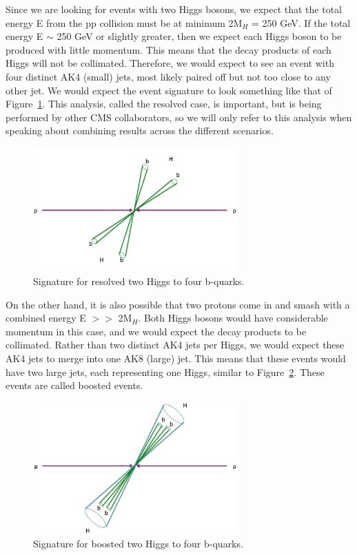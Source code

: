 Since we are looking for events with two Higgs bosons, we expect that the total energy E from the pp collision must be at minimum 2$\text{M}_{H}$ = 250 GeV. If the total energy E $\sim$ 250 GeV or slightly greater, then we expect each Higgs boson to be produced with little momentum. This means that the decay products of each Higgs will not be collimated. Therefore, we would expect to see an event with four distinct AK4 (small) jets, most likely paired off but not too close to any other jet. We would expect the event signature to look something like that of Figure~\ref{Fig:threecases1}. This analysis, called the resolved case, is important, but is being performed by other CMS collaborators, so we will only refer to this analysis when speaking about combining results across the different scenarios.
\begin{figure}[h!]
    \centering
       \includegraphics[width=0.7\textwidth]{F4/resolved.png}
        \caption{Signature for resolved two Higgs to four b-quarks.}
        \label{Fig:threecases1}
\end{figure}

On the other hand, it is also possible that two protons come in and smash with a combined energy E $>>$ 2$\text{M}_{H}$. Both Higgs bosons would have considerable momentum in this case, and we would expect the decay products to be collimated. Rather than two distinct AK4 jets per Higgs, we would expect these AK4 jets to merge into one AK8 (large) jet. This means that these events would have two large jets, each representing one Higgs, similar to Figure~\ref{Fig:threecases2}. These events are called boosted events.
\begin{figure}[h!]
    \centering
        \includegraphics[width=0.7\textwidth]{F4/merged.png}
        \caption{Signature for boosted two Higgs to four b-quarks.}
        \label{Fig:threecases2}
\end{figure}


